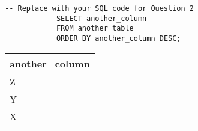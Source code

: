 \documentclass{article}
\begin{document}
\begin{figure}[h!]
    \centering
    \begin{minipage}{0.48\textwidth}
        \begin{lstlisting}[caption=SQL Code for Question 2, label=lst:sql_q2]
            -- Replace with your SQL code for Question 2
            SELECT another_column
            FROM another_table
            ORDER BY another_column DESC;
        \end{lstlisting}
    \end{minipage}%
    \hfill%
    \begin{minipage}{0.48\textwidth}
        \centering
        \begin{tabular}{l}
            \toprule
            another\_column \\
            \midrule
            Z             \\
            Y             \\
            X             \\
            \bottomrule
        \end{tabular}
        \label{tab:result_q2}
    \end{minipage}
\end{figure}

\end{document}
